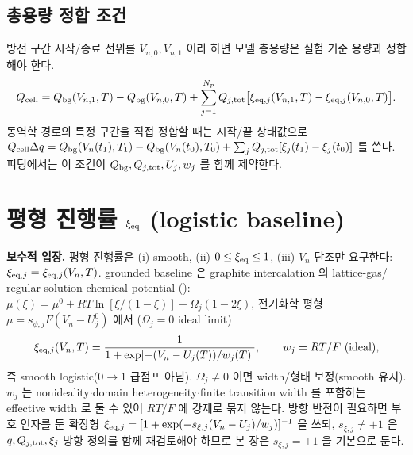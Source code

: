 \subsection{총용량 정합 조건}\label{sec:capmatch}
방전 구간 시작/종료 전위를 $V_{n,0},V_{n,1}$ 이라 하면 모델 총용량은 실험 기준 용량과 정합해야 한다.
\begin{equation}
Q_{\mathrm{cell}}=Q_{\mathrm{bg}}(V_{n,1},T)-Q_{\mathrm{bg}}(V_{n,0},T)+\sum_{j=1}^{N_p}Q_{j,\mathrm{tot}}\big[\xi_{\mathrm{eq},j}(V_{n,1},T)-\xi_{\mathrm{eq},j}(V_{n,0},T)\big].
\label{eq:capmatch}
\end{equation}
동역학 경로의 특정 구간을 직접 정합할 때는 시작/끝 상태값으로
$Q_{\mathrm{cell}}\Delta q=Q_{\mathrm{bg}}(V_n(t_1),T_1)-Q_{\mathrm{bg}}(V_n(t_0),T_0)+\sum_j Q_{j,\mathrm{tot}}[\xi_j(t_1)-\xi_j(t_0)]$ 를 쓴다.
피팅에서는 이 조건이 $Q_{\mathrm{bg}},Q_{j,\mathrm{tot}},U_j,w_j$ 를 함께 제약한다.

\section{평형 진행률 $\xi_{\mathrm{eq}}$ (logistic baseline)}\label{sec:eq}
\textbf{보수적 입장.} 평형 진행률은 (i) smooth, (ii) $0\le\xi_{\mathrm{eq}}\le1$, (iii) $V_n$ 단조만 요구한다:
$\xi_{\mathrm{eq},j}=\xi_{\mathrm{eq},j}(V_n,T)$. grounded baseline 은 graphite intercalation 의 lattice-gas/
regular-solution chemical potential \cite{mckinnon1983,bazant2013}():
$\mu(\xi)=\mu^0+RT\ln[\xi/(1-\xi)]+\Omega_j(1-2\xi)$, 전기화학 평형 $\mu=s_{\phi,j}F(V_n-U_j^0)$ 에서
($\Omega_j=0$ ideal limit)
\begin{equation}
\xi_{\mathrm{eq},j}(V_n,T)=\frac{1}{1+\exp[-(V_n-U_j(T))/w_j(T)]},\qquad w_j=RT/F\ (\text{ideal}),
\label{eq:logistic}
\end{equation}
즉 smooth logistic($0\!\to\!1$ 급점프 아님). $\Omega_j\ne0$ 이면 width/형태 보정(smooth 유지). $w_j$ 는
nonideality$\cdot$domain heterogeneity$\cdot$finite transition width 를 포함하는 effective width 로
둘 수 있어 $RT/F$ 에 강제로 묶지 않는다. 방향 반전이 필요하면 부호 인자를 둔 확장형
$\xi_{\mathrm{eq},j}=[1+\exp(-s_{\xi,j}(V_n-U_j)/w_j)]^{-1}$ 을 쓰되, $s_{\xi,j}\ne+1$ 은 $q,Q_{j,\mathrm{tot}},\xi_j$
방향 정의를 함께 재검토해야 하므로 본 장은 $s_{\xi,j}=+1$ 을 기본으로 둔다.

